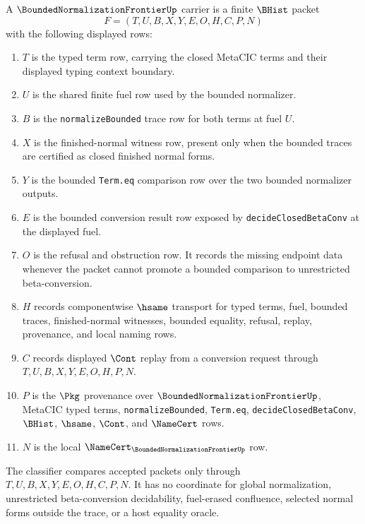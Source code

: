 \begin{definition}
\label{def:bounded-normalization-frontier-carrier}
A $\BoundedNormalizationFrontierUp$ carrier is a finite $\BHist$ packet
$$
F=(T,U,B,X,Y,E,O,H,C,P,N)
$$
with the following displayed rows:
\begin{enumerate}
\item $T$ is the typed term row, carrying the closed MetaCIC terms and their displayed typing context boundary.
\item $U$ is the shared finite fuel row used by the bounded normalizer.
\item $B$ is the \texttt{normalizeBounded} trace row for both terms at fuel $U$.
\item $X$ is the finished-normal witness row, present only when the bounded traces are certified as closed finished normal forms.
\item $Y$ is the bounded \texttt{Term.eq} comparison row over the two bounded normalizer outputs.
\item $E$ is the bounded conversion result row exposed by \texttt{decideClosedBetaConv} at the displayed fuel.
\item $O$ is the refusal and obstruction row. It records the missing endpoint data whenever the packet cannot promote a bounded comparison to unrestricted beta-conversion.
\item $H$ records componentwise $\hsame$ transport for typed terms, fuel, bounded traces, finished-normal witnesses, bounded equality, refusal, replay, provenance, and local naming rows.
\item $C$ records displayed $\Cont$ replay from a conversion request through $T,U,B,X,Y,E,O,H,P,N$.
\item $P$ is the $\Pkg$ provenance over $\BoundedNormalizationFrontierUp$, MetaCIC typed terms, \texttt{normalizeBounded}, \texttt{Term.eq}, \texttt{decideClosedBetaConv}, $\BHist$, $\hsame$, $\Cont$, and $\NameCert$ rows.
\item $N$ is the local $\NameCert_{\BoundedNormalizationFrontierUp}$ row.
\end{enumerate}
The classifier compares accepted packets only through $T,U,B,X,Y,E,O,H,C,P,N$. It has no coordinate for global normalization, unrestricted beta-conversion decidability, fuel-erased confluence, selected normal forms outside the trace, or a host equality oracle.
\end{definition}

